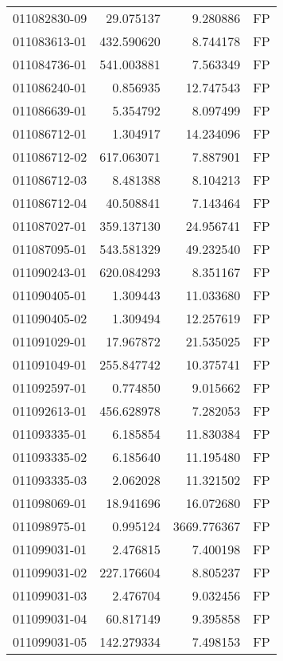 \begin{tabular}{lrrl}
011082830-09 &   29.075137 &       9.280886 &   FP \\
011083613-01 &  432.590620 &       8.744178 &   FP \\
011084736-01 &  541.003881 &       7.563349 &   FP \\
011086240-01 &    0.856935 &      12.747543 &   FP \\
011086639-01 &    5.354792 &       8.097499 &   FP \\
011086712-01 &    1.304917 &      14.234096 &   FP \\
011086712-02 &  617.063071 &       7.887901 &   FP \\
011086712-03 &    8.481388 &       8.104213 &   FP \\
011086712-04 &   40.508841 &       7.143464 &   FP \\
011087027-01 &  359.137130 &      24.956741 &   FP \\
011087095-01 &  543.581329 &      49.232540 &   FP \\
011090243-01 &  620.084293 &       8.351167 &   FP \\
011090405-01 &    1.309443 &      11.033680 &   FP \\
011090405-02 &    1.309494 &      12.257619 &   FP \\
011091029-01 &   17.967872 &      21.535025 &   FP \\
011091049-01 &  255.847742 &      10.375741 &   FP \\
011092597-01 &    0.774850 &       9.015662 &   FP \\
011092613-01 &  456.628978 &       7.282053 &   FP \\
011093335-01 &    6.185854 &      11.830384 &   FP \\
011093335-02 &    6.185640 &      11.195480 &   FP \\
011093335-03 &    2.062028 &      11.321502 &   FP \\
011098069-01 &   18.941696 &      16.072680 &   FP \\
011098975-01 &    0.995124 &    3669.776367 &   FP \\
011099031-01 &    2.476815 &       7.400198 &   FP \\
011099031-02 &  227.176604 &       8.805237 &   FP \\
011099031-03 &    2.476704 &       9.032456 &   FP \\
011099031-04 &   60.817149 &       9.395858 &   FP \\
011099031-05 &  142.279334 &       7.498153 &   FP \\

\end{tabular}
